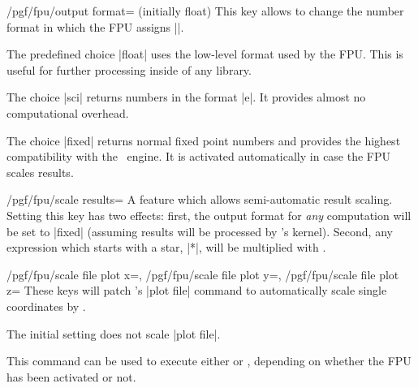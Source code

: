\begin{key}{/pgf/fpu/output format= (initially float)}
  This key allows to change the number format in which the FPU assigns
  |\pgfmathresult|. 
  
  The predefined choice |float| uses the low-level format used by the
  FPU. This is useful for further processing inside of any library. 
\begin{codeexample}[]
\pgfmathresult
\end{codeexample}

  The choice |sci| returns numbers in the format
  |e|. It provides almost no
  computational overhead. 
\begin{codeexample}[]
\pgfmathresult
\end{codeexample}

  The choice |fixed| returns normal fixed point numbers and provides
  the highest compatibility with the \pgfname\ engine. It is activated
  automatically in case the FPU scales results. 
\begin{codeexample}[]
\pgfmathresult
\end{codeexample}
\end{key}

\begin{key}{/pgf/fpu/scale results=}
  A feature which allows semi-automatic result scaling. Setting this
  key has two effects: first, the output format for \emph{any}
  computation will be set to |fixed| (assuming results will be
  processed by \pgfname's kernel). Second, any expression which starts
  with a star, |*|, will be multiplied with . 
\end{key}

\begin{keylist}{
    /pgf/fpu/scale file plot x=,%
    /pgf/fpu/scale file plot y=,%
    /pgf/fpu/scale file plot z=}%
  These keys will patch \pgfname's |plot file| command to
  automatically scale single coordinates by . 
  
  The initial setting does not scale |plot file|.
\end{keylist}

\begin{command}{\pgflibraryfpuifactive{}}
  This command can be used to execute either  or
  , depending on whether the FPU has been activated
  or not. 
\end{command}

